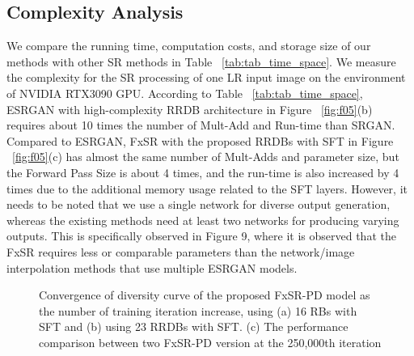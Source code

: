 \documentclass{article}
\begin{document}
\subsection{Complexity Analysis}
We compare the running time, computation costs, and storage size of our methods with other SR methods in Table ~\ref{tab:tab_time_space}. We measure the complexity for the SR  processing of one  LR input image on the environment of NVIDIA RTX3090 GPU. According to Table ~\ref{tab:tab_time_space}, ESRGAN with high-complexity RRDB architecture in Figure ~\ref{fig:f05}(b) requires about 10 times the number of Mult-Add and Run-time than SRGAN. Compared to ESRGAN, FxSR with the proposed RRDBs with SFT in Figure ~\ref{fig:f05}(c) has almost the same number of Mult-Adds and parameter size, but the Forward Pass Size is about 4 times, and the run-time is also increased by 4 times due to the additional memory usage related to the SFT layers. However, it needs to be noted that we use a single network for diverse output generation, whereas the existing methods need at least two networks for producing varying outputs. This is specifically observed in Figure 9, where it is observed that the FxSR requires less or comparable parameters than the network/image interpolation methods that use multiple ESRGAN models.
\begin{figure*}[!t]
\centering
\scriptsize
\begin{minipage}[t]{1.0\linewidth}
    \centering
    \hfill
{}\hfill
    \hfill
    \hfill
    \hfill
\end{minipage}
\caption{Convergence of diversity curve of the proposed FxSR-PD model as the number of training iteration increase, using (a) 16 RBs with SFT and (b) using 23 RRDBs with SFT. (c) The performance comparison between two FxSR-PD version at the 250,000th iteration}
\label{fig:fig_div_graph_ab}
\end{figure*}
\end{document}
